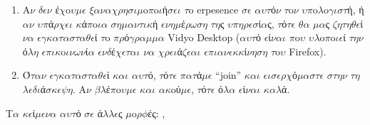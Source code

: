 \documentclass[a4paper,11pt,english]{sphinxmanual}
\begin{document}
\begin{description}
\begin{enumerate}
\item {} 
A\(\nu\) \(\delta\)\(\epsilon\)\(\nu\) έ\(\chi\)o\(\upsilon\)\(\mu\)\(\epsilon\) \(\xi\)\(\alpha\)\(\nu\)\(\alpha\)\(\chi\)\(\rho\)\(\eta\)\(\sigma\)\(\iota\)\(\mu\)o\(\pi\)o\(\iota\)ή\(\sigma\)\(\epsilon\)\(\iota\) \(\tau\)o erpesence \(\sigma\)\(\epsilon\) \(\alpha\)\(\upsilon\)\(\tau\)ό\(\nu\) \(\tau\)o\(\nu\) \(\upsilon\)\(\pi\)o\(\lambda\)o\(\gamma\)\(\iota\)\(\sigma\)\(\tau\)ή, ή \(\alpha\)\(\nu\) \(\upsilon\)\(\pi\)ά\(\rho\)\(\chi\)\(\epsilon\)\(\iota\) \(\kappa\)ά\(\pi\)o\(\iota\)\(\alpha\) \(\sigma\)\(\eta\)\(\mu\)\(\alpha\)\(\nu\)\(\tau\)\(\iota\)\(\kappa\)ή \(\epsilon\)\(\nu\)\(\eta\)\(\mu\)έ\(\rho\)\(\omega\)\(\sigma\)\(\eta\) \(\tau\)\(\eta\)ς \(\upsilon\)\(\pi\)\(\eta\)\(\rho\)\(\epsilon\)\(\sigma\)ί\(\alpha\)ς, \(\tau\)ό\(\tau\)\(\epsilon\) \(\theta\)\(\alpha\) \(\mu\)\(\alpha\)ς \(\zeta\)\(\eta\)\(\tau\)\(\eta\)\(\theta\)\(\epsilon\)ί \(\nu\)\(\alpha\) \(\epsilon\)\(\gamma\)\(\kappa\)\(\alpha\)\(\tau\)\(\alpha\)\(\sigma\)\(\tau\)\(\alpha\)\(\theta\)\(\epsilon\)ί \(\tau\)o \(\pi\)\(\rho\)ό\(\gamma\)\(\rho\)\(\alpha\)\(\mu\)\(\mu\)\(\alpha\) Vidyo Desktop (\(\alpha\)\(\upsilon\)\(\tau\)ό \(\epsilon\)ί\(\nu\)\(\alpha\)\(\iota\) \(\pi\)o\(\upsilon\) \(\upsilon\)\(\lambda\)o\(\pi\)o\(\iota\)\(\epsilon\)ί \(\tau\)\(\eta\)\(\nu\) ό\(\lambda\)\(\eta\) \(\epsilon\)\(\pi\)\(\iota\)\(\kappa\)o\(\iota\)\(\nu\)\(\omega\)\(\nu\)ί\(\alpha\) \textendash{}\(\epsilon\)\(\nu\)\(\delta\)έ\(\chi\)\(\epsilon\)\(\tau\)\(\alpha\)\(\iota\) \(\nu\)\(\alpha\) \(\chi\)\(\rho\)\(\epsilon\)\(\iota\)ά\(\zeta\)\(\epsilon\)\(\alpha\)\(\iota\) \(\epsilon\)\(\pi\)\(\iota\)\(\alpha\)\(\nu\)\(\epsilon\)\(\kappa\)\(\kappa\)ί\(\nu\)\(\eta\)\(\sigma\)\(\eta\) \(\tau\)o\(\upsilon\) Firefox).

\item {} 
Ό\(\tau\)\(\alpha\)\(\nu\) \(\epsilon\)\(\gamma\)\(\kappa\)\(\alpha\)\(\tau\)\(\alpha\)\(\sigma\)\(\tau\)\(\alpha\)\(\theta\)\(\epsilon\)ί \(\kappa\)\(\alpha\)\(\iota\) \(\alpha\)\(\upsilon\)\(\tau\)ό, \(\tau\)ό\(\tau\)\(\epsilon\) \(\pi\)\(\alpha\)\(\tau\)ά\(\mu\)\(\epsilon\) “join” \(\kappa\)\(\alpha\)\(\iota\) \(\epsilon\)\(\iota\)\(\sigma\)\(\epsilon\)\(\rho\)\(\chi\)ό\(\mu\)\(\alpha\)\(\sigma\)\(\tau\)\(\epsilon\) \(\sigma\)\(\tau\)\(\eta\)\(\nu\) \(\tau\)\(\eta\)\(\lambda\)\(\epsilon\)\(\delta\)\(\iota\)ά\(\sigma\)\(\kappa\)\(\epsilon\)\(\psi\)\(\eta\). A\(\nu\) \(\beta\)\(\lambda\)έ\(\pi\)o\(\upsilon\)\(\mu\)\(\epsilon\) \(\kappa\)\(\alpha\)\(\iota\) \(\alpha\)\(\kappa\)oύ\(\mu\)\(\epsilon\), \(\tau\)ό\(\tau\)\(\epsilon\) ό\(\lambda\)\(\alpha\) \(\epsilon\)ί\(\nu\)\(\alpha\)\(\iota\) \(\kappa\)\(\alpha\)\(\lambda\)ά.

\end{enumerate}

\end{description}

T\(\alpha\) \(\kappa\)\(\epsilon\)ί\(\mu\)\(\epsilon\)\(\nu\)\(\alpha\) \(\alpha\)\(\upsilon\)\(\tau\)ό \(\sigma\)\(\epsilon\) ά\(\lambda\)\(\lambda\)\(\epsilon\)ς \(\mu\)o\(\rho\)\(\phi\)ές: \sphinxcode{\sphinxupquote{{[}epub{]}}}, 



\renewcommand{\indexname}{Index}
\printindex
\end{document}
